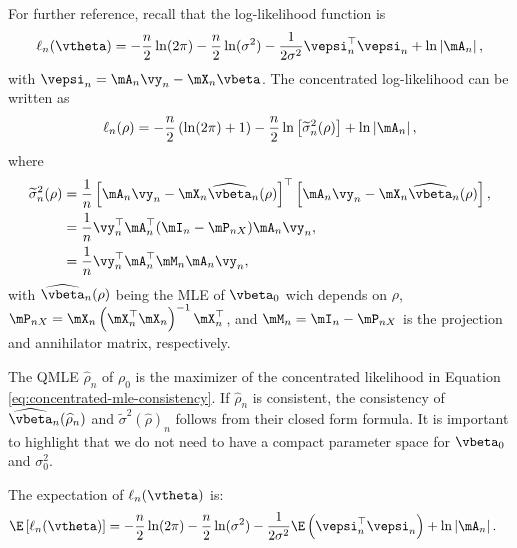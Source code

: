 \documentclass[english,12pt]{book}\usepackage[]{graphicx}\usepackage[]{xcolor}
\begin{document}
\begin{subappendices}
For further reference, recall that the log-likelihood function is 
\begin{equation*}
\ell_n(\vtheta) = -\frac{n}{2}\ln (2\pi) - \frac{n}{2}\ln(\sigma^2) - \frac{1}{2\sigma^2}\vepsi_n^\top\vepsi_n + \ln\left|\mA_n\right|,
\end{equation*}
with $\vepsi_n = \mA_n\vy_n - \mX_n\vbeta$. The concentrated log-likelihood can be written as
\begin{equation}\label{eq:concentrated-mle-consistency}
 \ell_n(\rho) =-\frac{n}{2}\left(\ln(2\pi) + 1\right) - \frac{n}{2}\ln\left[\widetilde{\sigma}^2_n(\rho)\right] + \ln\left|\mA_n\right|,
\end{equation}
%
where
\begin{equation}\label{eq:sigma-mle-consistency}
\begin{aligned}
\widetilde{\sigma}^2_n(\rho) & = \frac{1}{n}\left[\mA_n\vy_n - \mX_n\widehat{\vbeta}_n(\rho)\right]^\top \left[\mA_n\vy_n - \mX_n\widehat{\vbeta}_n(\rho)\right],  \\
& = \frac{1}{n}\vy_n^\top\mA_n^\top(\mI_n - \mP_{nX})\mA_n\vy_n, \\
& = \frac{1}{n}\vy_n^\top\mA_n^\top\mM_n\mA_n\vy_n,
\end{aligned}
\end{equation}
%
with $\widehat{\vbeta}_n(\rho)$ being the MLE of $\vbeta_0$ wich depends on $\rho$, $\mP_{nX} = \mX_n\left(\mX_n^\top\mX_n\right)^{-1}\mX_n^\top$, and $\mM_n = \mI_n - \mP_{nX}$ is the projection and annihilator matrix, respectively.

The QMLE $\widehat{\rho}_n$ of $\rho_0$ is the maximizer of the concentrated likelihood in Equation \eqref{eq:concentrated-mle-consistency}. If $\widehat{\rho}_n$ is consistent, the consistency of $\widehat{\vbeta}_n(\widehat{\rho}_n)$ and $\widetilde{\sigma}^2(\widehat{\rho})_n$ follows from their closed form formula. It is important to highlight that we do not need to have a compact parameter space for $\vbeta_0$ and $\sigma_0^2$.

The expectation of $\ell_n(\vtheta)$ is:
\begin{equation}\label{eq:expectation-log-slm}
  \begin{aligned}
    \E\left[\ell_n(\vtheta)\right] & = -\frac{n}{2}\ln (2\pi) - \frac{n}{2}\ln(\sigma^2) - \frac{1}{2\sigma^2}\E\left(\vepsi_n^\top\vepsi_n\right) + \ln\left|\mA_n\right|.
  \end{aligned}
\end{equation}


\end{subappendices}
\end{document}
